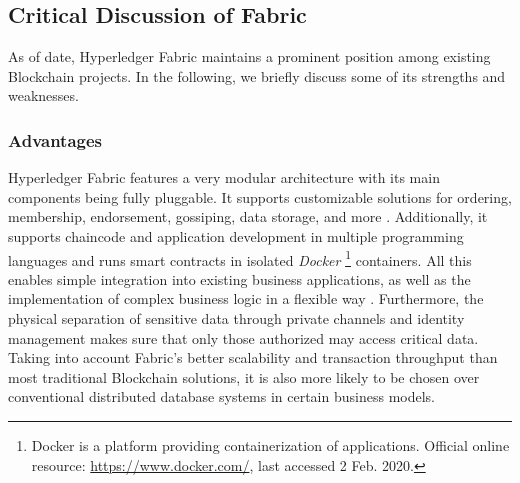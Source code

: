 \subsection{Critical Discussion of Fabric}
As of date, Hyperledger Fabric maintains a prominent position among existing Blockchain projects. 
In the following, we briefly discuss some of its strengths and weaknesses. 

\subsubsection{Advantages}
Hyperledger Fabric features a very modular architecture with its main components being fully pluggable. It supports customizable solutions for ordering, membership, endorsement, gossiping, data storage, and more \cite{Androulaki2018}. Additionally, it supports chaincode and application development in multiple programming languages and runs smart contracts in isolated \textit{Docker} \footnote{Docker is a platform providing containerization of applications. Official online resource: \url{https://www.docker.com/}, last accessed 2 Feb. 2020. } containers. All this enables simple integration into existing business applications, as well as the implementation of complex business logic in a flexible way \cite{Davies2019}. Furthermore, the physical separation of sensitive data through private channels and identity management makes sure that only those authorized may access critical data. Taking into account Fabric's better scalability and transaction throughput than most traditional Blockchain solutions, it is also more likely to be chosen over conventional distributed database systems in certain business models. \\

